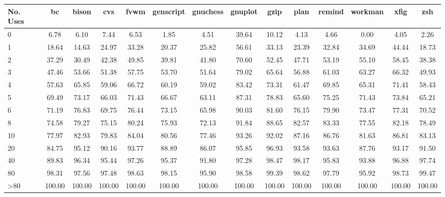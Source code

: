 \begin{tabular}{|l|c|c|c|c|c|c|c|c|c|c|c|c|c|}\hline
No. Uses & bc & bison & cvs & fvwm & genscript & gnuchess & gnuplot & gzip & plan & remind & workman & xfig & zsh\\\hline\hline
0 & 6.78 & 6.10 & 7.44 & 6.53 & 1.85 & 4.51 & 39.64 & 10.12 & 4.13 & 4.66 & 0.00 & 4.05 & 2.26\\\hline
1 & 18.64 & 14.63 & 24.97 & 33.28 & 20.37 & 25.82 & 56.61 & 33.13 & 23.39 & 32.84 & 34.69 & 44.44 & 18.73\\\hline
2 & 37.29 & 30.49 & 42.38 & 49.85 & 39.81 & 41.80 & 70.60 & 52.45 & 47.71 & 53.19 & 55.10 & 58.45 & 38.38\\\hline
3 & 47.46 & 53.66 & 51.38 & 57.75 & 53.70 & 51.64 & 79.02 & 65.64 & 56.88 & 61.03 & 63.27 & 66.32 & 49.93\\\hline
4 & 57.63 & 65.85 & 59.06 & 66.72 & 60.19 & 59.02 & 83.42 & 73.31 & 61.47 & 69.85 & 65.31 & 71.41 & 58.43\\\hline
5 & 69.49 & 73.17 & 66.03 & 71.43 & 66.67 & 63.11 & 87.31 & 78.83 & 65.60 & 75.25 & 71.43 & 73.84 & 65.21\\\hline
6 & 71.19 & 76.83 & 69.75 & 76.44 & 73.15 & 65.98 & 90.03 & 81.60 & 76.15 & 79.90 & 73.47 & 77.31 & 70.52\\\hline
8 & 74.58 & 79.27 & 75.15 & 80.24 & 75.93 & 72.13 & 91.84 & 88.65 & 82.57 & 83.33 & 77.55 & 82.18 & 78.49\\\hline
10 & 77.97 & 82.93 & 79.83 & 84.04 & 80.56 & 77.46 & 93.26 & 92.02 & 87.16 & 86.76 & 81.63 & 86.81 & 83.13\\\hline
20 & 84.75 & 95.12 & 90.16 & 93.77 & 88.89 & 86.07 & 95.85 & 96.93 & 93.58 & 93.63 & 87.76 & 93.17 & 91.50\\\hline
40 & 89.83 & 96.34 & 95.44 & 97.26 & 95.37 & 91.80 & 97.28 & 98.47 & 98.17 & 95.83 & 93.88 & 96.88 & 97.74\\\hline
80 & 98.31 & 97.56 & 97.48 & 98.63 & 98.15 & 95.90 & 98.58 & 99.39 & 98.62 & 97.79 & 95.92 & 98.73 & 99.47\\\hline
>80 & 100.00 & 100.00 & 100.00 & 100.00 & 100.00 & 100.00 & 100.00 & 100.00 & 100.00 & 100.00 & 100.00 & 100.00 & 100.00\\\hline
\hline
\end{tabular}

